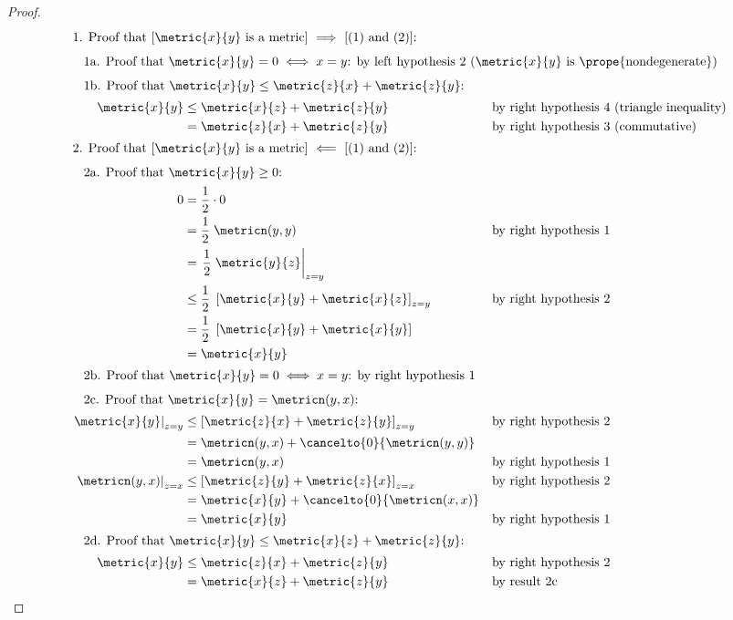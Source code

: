 \begin{proof}
  \begin{align*}
    \intertext{1. Proof that [$\metric{x}{y} \text{ is a metric}$] $\implies$ [(1) and (2)]:}
    \intertext{\hspace{2ex}1a. Proof that $\metric{x}{y}=0\iff x=y$: by left hypothesis 2 ($\metric{x}{y}$ is \prope{nondegenerate})}
    \intertext{\hspace{2ex}1b. Proof that $\metric{x}{y}\le\metric{z}{x}+\metric{z}{y}$:}
      \metric{x}{y}
        &\le \metric{x}{z} + \metric{z}{y}
        &&   \text{by right hypothesis 4 (triangle inequality)}
      \\&=   \metric{z}{x} + \metric{z}{y}
        &&   \text{by right hypothesis 3 (commutative)}
      \\
    \intertext{2. Proof that [$\metric{x}{y} \text{ is a metric}$] $\impliedby$ [(1) and (2)]:}
    \intertext{\hspace{2ex}2a. Proof that $\metric{x}{y}\ge0$:}
      0
        &=   \frac{1}{2}\cdot 0
      \\&=   \frac{1}{2}\;\metricn(y,y)
        &&   \text{by right hypothesis 1}
      \\&=   \left.\frac{1}{2}\;\metric{y}{z} \right|_{z=y}
      \\&\le \frac{1}{2}\;\left[ \metric{x}{y} + \metric{x}{z} \right]_{z=y}
        &&   \text{by right hypothesis 2}
      \\&=   \frac{1}{2}\;\left[\metric{x}{y} + \metric{x}{y} \right]
      \\&=   \metric{x}{y}
      \\
    \intertext{\hspace{2ex}2b. Proof that $\metric{x}{y}=0\iff x=y$: by right hypothesis 1}
    \intertext{\hspace{2ex}2c. Proof that $\metric{x}{y}=\metricn(y,x)$:}
      \left. \metric{x}{y} \right|_{z=y}
        &\le \left[ \metric{z}{x} + \metric{z}{y} \right]_{z=y}
        &&   \text{by right hypothesis 2}
      \\&=   \metricn(y,x) + \cancelto{0}{\metricn(y,y)}
      \\&=   \metricn(y,x)
        &&   \text{by right hypothesis 1}
      \\
      \left. \metricn(y,x) \right|_{z=x}
        &\le \left[ \metric{z}{y} + \metric{z}{x} \right]_{z=x}
        &&   \text{by right hypothesis 2}
      \\&=   \metric{x}{y} + \cancelto{0}{\metricn(x,x)}
      \\&=   \metric{x}{y}
        &&   \text{by right hypothesis 1}
      \\
    \intertext{\hspace{2ex}2d. Proof that $\metric{x}{y}\le \metric{x}{z}+\metric{z}{y}$:}
      \metric{x}{y}
        &\le \metric{z}{x} + \metric{z}{y}
        &&   \text{by right hypothesis 2}
      \\&=   \metric{x}{z} + \metric{z}{y}
        &&   \text{by result 2c}
      \\
  \end{align*}
\end{proof}

